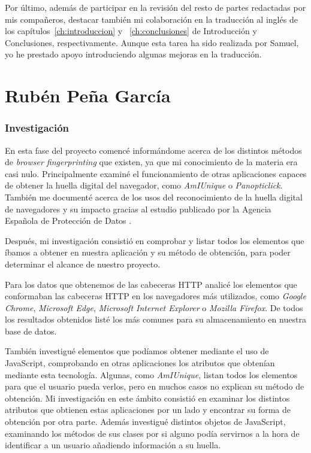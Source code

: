 Por último, además de participar en la revisión del resto de partes redactadas por mis compañeros, destacar también mi colaboración en la traducción al inglés de los capítulos~\ref{ch:introduccion} y ~\ref{ch:conclusiones} de Introducción y Conclusiones, respectivamente. Aunque esta tarea ha sido realizada por Samuel, yo he prestado apoyo introduciendo algunas mejoras en la traducción. \par


\section{Rubén Peña García}
\subsubsection{Investigación}
En esta fase del proyecto comencé informándome acerca de los distintos métodos de \textit{browser fingerprinting} que existen, ya que mi conocimiento de la materia era casi nulo. Principalmente examiné el funcionamiento de otras aplicaciones capaces de obtener la huella digital del navegador, como \textit{AmIUnique}\cite{amiunique} o \textit{Panopticlick}\cite{panop_paper}. También me documenté acerca de los usos del reconocimiento de la huella digital de navegadores y su impacto gracias al estudio publicado por la Agencia Española de Protección de Datos \cite{aepd}.\par
Después, mi investigación consistió en comprobar y listar todos los elementos que íbamos a obtener en nuestra aplicación y su método de obtención, para poder determinar el alcance de nuestro proyecto.\par
Para los datos que obtenemos de las cabeceras HTTP analicé los elementos que conformaban las cabeceras HTTP en los navegadores más utilizados, como \textit{Google Chrome}, \textit{Microsoft Edge}, \textit{Microsoft Internet Explorer} o \textit{Mozilla Firefox}. De todos los resultados obtenidos listé los más comunes para su almacenamiento en nuestra base de datos.\par
También investigué elementos que podíamos obtener mediante el uso de JavaScript, comprobando en otras aplicaciones los atributos que obtenían mediante esta tecnología. Algunas, como \textit{AmIUnique}, listan todos los elementos para que el usuario pueda verlos, pero en muchos casos no explican su método de obtención. Mi investigación en este ámbito consistió en examinar los distintos atributos que obtienen estas aplicaciones por un lado y encontrar su forma de obtención por otra parte. Además investigué distintos objetos de JavaScript, examinando los métodos de sus clases por si alguno podía servirnos a la hora de identificar a un usuario añadiendo información a su huella.
